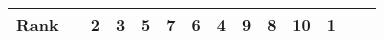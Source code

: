 \begin{tabular}{ll|rrrrrrrrr|rrr}

  


  
  Rank & &
  2 & 3 & 5 & 7 & 6 & 4 & 9 & 8 & 10 & 1 &  &  \\\hline\hline
\end{tabular}


